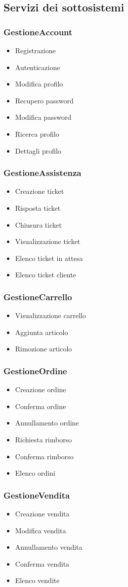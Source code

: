 \documentclass[12pt,a4paper]{article}
\begin{document}
\newpage

\subsection{Servizi dei sottosistemi}
\subsubsection{GestioneAccount}
\begin{itemize}
\item Registrazione
\item Autenticazione
\item Modifica profilo
\item Recupero password
\item Modifica password
\item Ricerca profilo
\item Dettagli profilo
\end{itemize}

\subsubsection{GestioneAssistenza}
\begin{itemize}
\item Creazione ticket
\item Risposta ticket
\item Chiusura ticket
\item Visualizzazione ticket
\item Elenco ticket in attesa
\item Elenco ticket cliente
\end{itemize}

\subsubsection{GestioneCarrello}
\begin{itemize}
\item Visualizzazione carrello
\item Aggiunta articolo
\item Rimozione articolo
\end{itemize}

\subsubsection{GestioneOrdine}
\begin{itemize}
\item Creazione ordine
\item Conferma ordine
\item Annullamento ordine
\item Richiesta rimborso
\item Conferma rimborso
\item Elenco ordini
\end{itemize}

\subsubsection{GestioneVendita}
\begin{itemize}
\item Creazione vendita
\item Modifica vendita
\item Annullamento vendita
\item Conferma vendita
\item Elenco vendite
\end{itemize}
\end{document}
